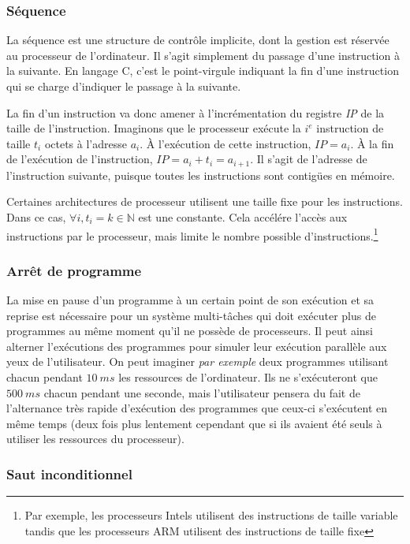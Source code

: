 \documentclass[../../../main.tex]{subfiles}
\begin{document}
\subsubsection{Séquence}
 
La séquence est une structure de contrôle implicite, dont la gestion est réservée au processeur de l'ordinateur. Il s'agit simplement du passage d'une instruction à la suivante. En langage C, c'est le point-virgule indiquant la fin d'une instruction qui se charge d'indiquer le passage à la suivante.
 
La fin d'un instruction va donc amener à l'incrémentation du registre \textit{IP} de la taille de l'instruction. Imaginons que le processeur exécute la $i^e$ instruction de taille $t_{i}$ octets à l'adresse $a_{i}$. À l'exécution de cette instruction, $IP = a_{i}$. À la fin de l'exécution de l'instruction, $\textit{IP} = a_{i} + t_{i} = a_{i+1}$. Il s'agit de l'adresse de l'instruction suivante, puisque toutes les instructions sont contigües en mémoire.
 
Certaines architectures de processeur utilisent une taille fixe pour les instructions. Dans ce cas, $\forall{i}, t_{i} = k\in{\mathbb{N}}$ est une constante. Cela accélére l'accès aux instructions par le processeur, mais limite le nombre possible d'instructions.\footnote{Par exemple, les processeurs Intels utilisent des instructions de taille variable tandis que les processeurs ARM utilisent des instructions de taille fixe}
 
\subsubsection{Arrêt de programme}
 
La mise en pause d'un programme à un certain point de son exécution et sa reprise est nécessaire pour un système multi-tâches qui doit exécuter plus de programmes au même moment qu'il ne possède de processeurs. Il peut ainsi alterner l'exécutions des programmes pour simuler leur exécution parallèle aux yeux de l'utilisateur. On peut imaginer \textit{par exemple} deux programmes utilisant chacun pendant $10\ ms$ les ressources de l'ordinateur. Ils ne s'exécuteront que $500\ ms$ chacun pendant une seconde, mais l'utilisateur pensera du fait de l'alternance très rapide d'exécution des programmes que ceux-ci s'exécutent en même temps (deux fois plus lentement cependant que si ils avaient été seuls à utiliser les ressources du processeur).
 
\subsubsection{Saut inconditionnel}
 
\end{document}
